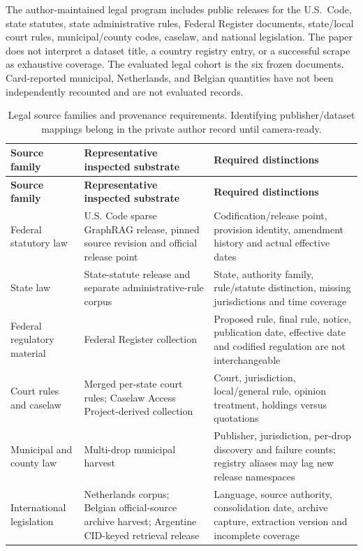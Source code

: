 \documentclass{article}
\begin{document}
The author-maintained legal program includes public releases for the U.S.\ Code, state statutes, state administrative rules, Federal Register documents, state/local court rules, municipal/county codes, caselaw, and national legislation. The paper does not interpret a dataset title, a country registry entry, or a successful scrape as exhaustive coverage. The evaluated legal cohort is the six frozen documents. Card-reported municipal, Netherlands, and Belgian quantities have not been independently recounted and are not evaluated records.
\begingroup
\renewcommand{\thetable}{A1}
\begin{longtable}{@{}>{\raggedright\arraybackslash}p{.24\linewidth} >{\raggedright\arraybackslash}p{.32\linewidth} >{\raggedright\arraybackslash}p{.38\linewidth}@{}}
\caption{Legal source families and provenance requirements. Identifying publisher/dataset mappings belong in the private author record until camera-ready.}\label{tab:A1}\\
\toprule
\textbf{Source family} & \textbf{Representative inspected substrate} & \textbf{Required distinctions} \\
\midrule
\endfirsthead
\textbf{Source family} & \textbf{Representative inspected substrate} & \textbf{Required distinctions} \\
\midrule
\endhead
\bottomrule
\endlastfoot
Federal statutory law & U.S. Code sparse GraphRAG release, pinned source revision and official release point & Codification/release point, provision identity, amendment history and actual effective dates \\[3pt]
State law & State-statute release and separate administrative-rule corpus & State, authority family, rule/statute distinction, missing jurisdictions and time coverage \\[3pt]
Federal regulatory material & Federal Register collection & Proposed rule, final rule, notice, publication date, effective date and codified regulation are not interchangeable \\[3pt]
Court rules and caselaw & Merged per-state court rules; Caselaw Access Project-derived collection & Court, jurisdiction, local/general rule, opinion treatment, holdings versus quotations \\[3pt]
Municipal and county law & Multi-drop municipal harvest & Publisher, jurisdiction, per-drop discovery and failure counts; registry aliases may lag new release namespaces \\[3pt]
International legislation & Netherlands corpus; Belgian official-source archive harvest; Argentine CID-keyed retrieval release & Language, source authority, consolidation date, archive capture, extraction version and incomplete coverage \\[3pt]
\end{longtable}
\endgroup
\end{document}
